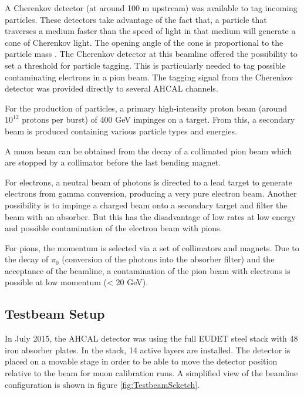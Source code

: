 A Cherenkov detector (at around 100 m upstream) was available to tag incoming particles. These detectors take advantage of the fact that, a particle that traverses a medium faster than the speed of light in that medium will generate a cone of Cherenkov light. The opening angle of the cone is proportional to the particle mass \cite{GOVORKOV20059}. The Cherenkov detector at this beamline offered the possibility to set a threshold for particle tagging. This is particularly needed to tag possible contaminating electrons in a pion beam. The tagging signal from the Cherenkov detector was provided directly to several AHCAL channels.

For the production of particles, a primary high-intensity proton beam (around $10^{12}$ protons per burst) of 400 GeV impinges on a target. From this, a secondary beam is produced containing various particle types and energies.

A muon beam can be obtained from the decay of a collimated pion beam which are stopped by a collimator before the last bending magnet.

For electrons, a neutral beam of photons is directed to a lead target to generate electrons from gamma conversion, producing a very pure electron beam. Another possibility is to impinge a charged beam onto a secondary target and filter the beam with an absorber. But this has the disadvantage of low rates at low energy and possible contamination of the electron beam with pions.

For pions, the momentum is selected via a set of collimators and magnets. Due to the decay of $\pi_0$ (conversion of the photons into the absorber filter) and the acceptance of the beamline, a contamination of the pion beam with electrons is possible at low momentum (< 20 GeV).

\subsection{Testbeam Setup}
\label{sec:TBsetup}

In July 2015, the AHCAL detector was using the full EUDET steel stack \cite{EUDET-Report-2010-02} with 48 iron absorber plates. In the stack, 14 active layers are installed. The detector is placed on a movable stage in order to be able to move the detector position relative to the beam for muon calibration runs. A simplified view of the beamline configuration is shown in figure \ref{fig:TestbeamScketch}.

